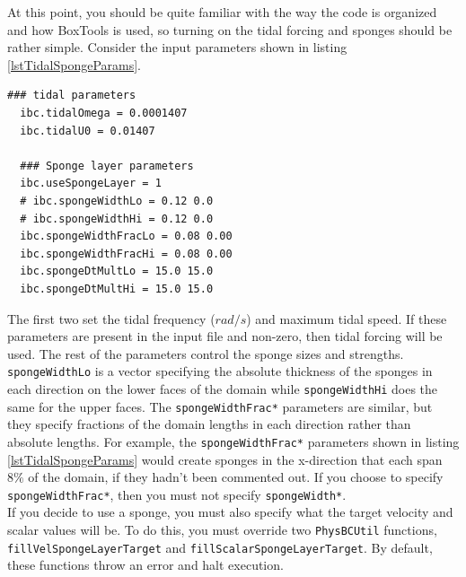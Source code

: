 \documentclass[12pt]{article}
\begin{document}
At this point, you should be quite familiar with the way the code is organized and how BoxTools is used, so turning on the tidal forcing and sponges should be rather simple. Consider the input parameters shown in listing \ref{lstTidalSpongeParams}.
\begin{lstlisting}[label=lstTidalSpongeParams]
  ### tidal parameters
  ibc.tidalOmega = 0.0001407
  ibc.tidalU0 = 0.01407

  ### Sponge layer parameters
  ibc.useSpongeLayer = 1
  # ibc.spongeWidthLo = 0.12 0.0
  # ibc.spongeWidthHi = 0.12 0.0
  ibc.spongeWidthFracLo = 0.08 0.00
  ibc.spongeWidthFracHi = 0.08 0.00
  ibc.spongeDtMultLo = 15.0 15.0
  ibc.spongeDtMultHi = 15.0 15.0
\end{lstlisting}
The first two set the tidal frequency ($rad/s$) and maximum tidal speed. If these parameters are present in the input file and non-zero, then tidal forcing will be used. The rest of the parameters control the sponge sizes and strengths. \texttt{spongeWidthLo} is a vector specifying the absolute thickness of the sponges in each direction on the lower faces of the domain while \texttt{spongeWidthHi} does the same for the upper faces. The \texttt{spongeWidthFrac*} parameters are similar, but they specify fractions of the domain lengths in each direction rather than absolute lengths. For example, the \texttt{spongeWidthFrac*} parameters shown in listing \ref{lstTidalSpongeParams} would create sponges in the x-direction that each span $8\%$ of the domain, if they hadn't been commented out. If you choose to specify \texttt{spongeWidthFrac*}, then you must not specify \texttt{spongeWidth*}.\\

If you decide to use a sponge, you must also specify what the target velocity and scalar values will be. To do this, you must override two \texttt{PhysBCUtil} functions, \texttt{fillVelSpongeLayerTarget} and \texttt{fillScalarSpongeLayerTarget}. By default, these functions throw an error and halt execution.


% 
%
% 
% 


\end{document}
